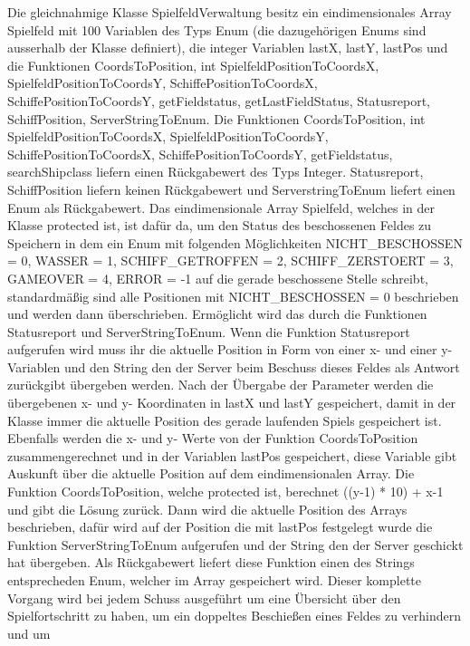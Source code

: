 Die gleichnahmige Klasse SpielfeldVerwaltung besitz ein \newline eindimensionales Array Spielfeld mit 100 Variablen des Typs Enum
(die dazugehörigen Enums sind ausserhalb der Klasse definiert), die integer Variablen lastX, lastY, lastPos und die Funktionen CoordsToPosition, int SpielfeldPositionToCoordsX, 
SpielfeldPositionToCoordsY, SchiffePositionToCoordsX, SchiffePositionToCoordsY, getFieldstatus, getLastFieldStatus, Statusreport, SchiffPosition, ServerStringToEnum.\newline 
Die Funktionen CoordsToPosition, int SpielfeldPositionToCoordsX, SpielfeldPositionToCoordsY, SchiffePositionToCoordsX, SchiffePositionToCoordsY, getFieldstatus, searchShipclass 
liefern einen Rückgabewert des Typs Integer. 
Statusreport, SchiffPosition liefern keinen Rückgabewert und ServerstringToEnum liefert einen Enum als Rückgabewert. 
Das eindimensionale Array Spielfeld, welches in der Klasse protected ist, ist dafür da, um den Status des beschossenen Feldes zu Speichern in dem ein Enum mit folgenden Möglichkeiten 
NICHT\_BESCHOSSEN = 0, WASSER = 1, SCHIFF\_GETROFFEN = 2, SCHIFF\_ZERSTOERT = 3, GAMEOVER = 4, ERROR = -1 auf die gerade beschossene Stelle schreibt, standardmäßig sind alle 
Positionen mit NICHT\_BESCHOSSEN = 0 beschrieben und werden dann überschrieben. Ermöglicht wird das durch die Funktionen Statusreport und ServerStringToEnum. Wenn die Funktion 
Statusreport aufgerufen wird muss ihr die aktuelle Position in Form von einer x- und einer y-Variablen und den String den der Server beim Beschuss dieses Feldes als Antwort 
zurückgibt übergeben werden. Nach der Übergabe der Parameter werden die übergebenen x- und y- Koordinaten in lastX und lastY gespeichert, damit in der Klasse immer die aktuelle 
Position des gerade laufenden Spiels gespeichert ist. Ebenfalls werden die x- und y- Werte von der Funktion CoordsToPosition zusammengerechnet und in der Variablen lastPos 
gespeichert, diese Variable gibt Auskunft über die aktuelle Position auf dem eindimensionalen Array. Die Funktion CoordsToPosition, welche protected ist, berechnet ((y-1) * 10) + x-1 
und gibt die Lösung zurück. Dann wird die aktuelle Position des Arrays beschrieben, dafür wird auf der Position die mit lastPos festgelegt wurde die Funktion ServerStringToEnum 
aufgerufen und der String den der Server geschickt hat übergeben. Als Rückgabewert liefert diese Funktion einen des Strings entsprecheden Enum, welcher im Array gespeichert wird. 
Dieser komplette Vorgang wird bei jedem Schuss ausgeführt um eine Übersicht über den Spielfortschritt zu haben, um ein doppeltes Beschießen eines Feldes zu verhindern und um 

